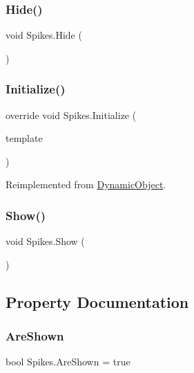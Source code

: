 \subsubsection{\texorpdfstring{Hide()}{Hide()}}
{\footnotesize\ttfamily void Spikes.\+Hide (\begin{DoxyParamCaption}{ }\end{DoxyParamCaption})}

\mbox{\label{class_spikes_a24d8653eda16bb5bdfb56c856c456153}} 
\subsubsection{\texorpdfstring{Initialize()}{Initialize()}}
{\footnotesize\ttfamily override void Spikes.\+Initialize (\begin{DoxyParamCaption}\item[{\mbox{\hyperlink{class_dynamic_object_template}{Dynamic\+Object\+Template}}}]{template }\end{DoxyParamCaption})\hspace{0.3cm}{\ttfamily [virtual]}}



Reimplemented from \mbox{\hyperlink{class_dynamic_object_a51dc678c061bc3a5eb60c3d96a1ef506}{Dynamic\+Object}}.

\mbox{\label{class_spikes_ac1dc1a9b907505df55cb2c0f01816ba0}} 
\subsubsection{\texorpdfstring{Show()}{Show()}}
{\footnotesize\ttfamily void Spikes.\+Show (\begin{DoxyParamCaption}{ }\end{DoxyParamCaption})}



\subsection{Property Documentation}
\mbox{\label{class_spikes_ad4d3a91975a432b636f1abdc2666a01e}} 
\subsubsection{\texorpdfstring{Are\+Shown}{AreShown}}
{\footnotesize\ttfamily bool Spikes.\+Are\+Shown = true\hspace{0.3cm}{\ttfamily [get]}}


